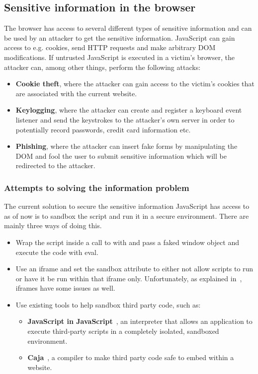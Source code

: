 \subsection{Sensitive information in the browser}
The browser has access to several different types of sensitive information and can be used by an attacker to get the sensitive information. JavaScript can gain access to e.g. cookies, send HTTP requests and make arbitrary DOM modifications. If untrusted JavaScript is executed in a victim's browser, the attacker can, among other things, perform the following attacks:
\begin{itemize}
  \item \textbf{Cookie theft}, where the attacker can gain access to the victim's cookies that are associated with the current website.
  \item \textbf{Keylogging}, where the attacker can create and register a keyboard event listener and send the keystrokes to the attacker's own server in order to potentially record passwords, credit card information etc.
  \item \textbf{Phishing}, where the attacker can insert fake forms by manipulating the DOM and fool the user to submit sensitive information which will be redirected to the attacker.
\end{itemize}
\subsubsection{Attempts to solving the information problem}
The current solution to secure the sensitive information JavaScript has access to as of now is to sandbox the script and run it in a secure environment. There are mainly three ways of doing this.
\begin{itemize}
  \item Wrap the script inside a call to with and pass a faked window object and execute the code with eval.
  \item Use an iframe and set the sandbox attribute to either not allow scripts to run or have it be run within that iframe only. Unfortunately, as explained in~\cite{js_in_js}, iframes have some issues as well.
  \item Use existing tools to help sandbox third party code, such as:
    \begin{itemize}
      \item \textbf{JavaScript in JavaScript}~\cite{js_in_js}, an interpreter that allows an application to execute third-party scripts in a completely isolated, sandboxed environment.
      \item \textbf{Caja}~\cite{caja_spec}, a compiler to make third party code safe to embed within a website.
    \end{itemize}
\end{itemize}
